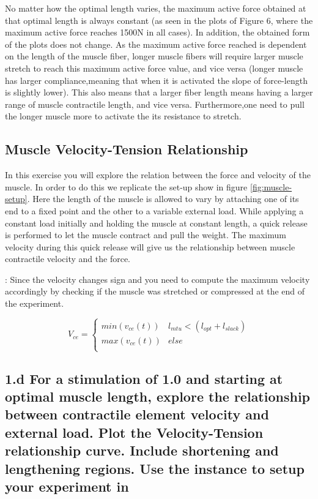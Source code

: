 \documentclass{cmc}
\begin{document}
No matter how the optimal length varies, the maximum active force obtained at that optimal length is always constant (as seen in the plots of Figure 6, where the maximum active force reaches 1500N in all cases). In addition, the obtained form of the plots does not change. As the maximum active force reached is dependent on the length of the muscle fiber, longer muscle fibers will require larger muscle stretch to reach this maximum active force value, and vice versa (longer muscle has larger compliance,meaning that when it is activated the slope of force-length is slightly lower). This also means that a larger fiber length means having a larger range of muscle contractile length, and vice versa. Furthermore,one need to pull the longer muscle more to activate the its resistance to stretch. 


\subsection*{Muscle Velocity-Tension Relationship}
In this exercise you will explore the relation between the force and
velocity of the muscle. In order to do this we replicate the set-up
show in figure \ref{fig:muscle-setup}. Here the length of the muscle
is allowed to vary by attaching one of its end to a fixed point and
the other to a variable external load. While applying a constant load
initially and holding the muscle at constant length, a quick release
is performed to let the muscle contract and pull the weight. The
maximum velocity during this quick release will give us the
relationship between muscle contractile velocity and the force.


 : Since the velocity changes sign and you need to compute the maximum
velocity accordingly by checking if the muscle was stretched or compressed
at the end of the experiment.

\begin{equation}
  \label{eq:2}
 V_{ce} = \left\{
\begin{array}{ll}
      min(v_{ce}(t)) & l_{mtu} < (l_{opt} + l_{slack}) \\
      max(v_{ce}(t)) & else \\
\end{array}
\right.
\end{equation}

\subsection*{1.d For a stimulation of 1.0 and starting at optimal
  muscle length, explore the relationship between contractile element
  velocity and external load. Plot the Velocity-Tension relationship
  curve. Include shortening and lengthening regions. Use the
   instance
  to setup your experiment in }
  
\end{document}
